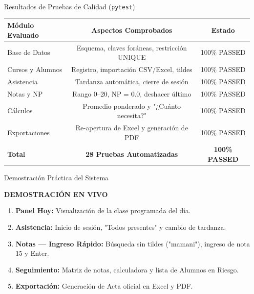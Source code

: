 \documentclass[aspectratio=169,10pt]{beamer}
\begin{document}
\begin{frame}{Resultados de Pruebas de Calidad (\texttt{pytest})}
  \begin{center}
    \small
    \begin{tabular}{l c c}
      \toprule
      \textbf{Módulo Evaluado} & \textbf{Aspectos Comprobados} & \textbf{Estado} \\
      \midrule
      Base de Datos & Esquema, claves foráneas, restricción UNIQUE & 100\% PASSED \\
      Cursos y Alumnos & Registro, importación CSV/Excel, tildes & 100\% PASSED \\
      Asistencia & Tardanza automática, cierre de sesión & 100\% PASSED \\
      Notas y NP & Rango 0--20, NP = 0.0, deshacer último & 100\% PASSED \\
      Cálculos & Promedio ponderado y "¿Cuánto necesita?" & 100\% PASSED \\
      Exportaciones & Re-apertura de Excel y generación de PDF & 100\% PASSED \\
      \midrule
      \textbf{Total} & \textbf{28 Pruebas Automatizadas} & \textbf{100\% PASSED} \\
      \bottomrule
    \end{tabular}
  \end{center}
\end{frame}

\begin{frame}{Demostración Práctica del Sistema}
  \begin{center}
    \Large \textbf{DEMOSTRACIÓN EN VIVO} \\[0.4cm]
    \small
    \begin{enumerate}
      \item \textbf{Panel Hoy:} Visualización de la clase programada del día.
      \item \textbf{Asistencia:} Inicio de sesión, "Todos presentes" y cambio de tardanza.
      \item \textbf{Notas — Ingreso Rápido:} Búsqueda sin tildes ("mamani"), ingreso de nota 15 y Enter.
      \item \textbf{Seguimiento:} Matriz de notas, calculadora y lista de Alumnos en Riesgo.
      \item \textbf{Exportación:} Generación de Acta oficial en Excel y PDF.
    \end{enumerate}
  \end{center}
\end{frame}
\end{document}
